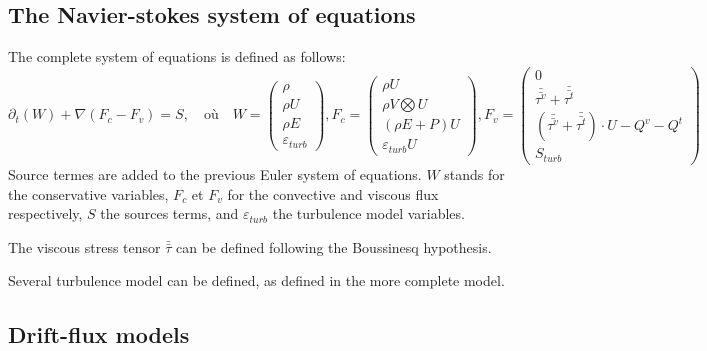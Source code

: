 \subsection{The Navier-stokes system of equations}
The complete system of equations is defined as follows:
\begin{equation}
\partial_t (W) + \nabla (F_c-F_v) = S,
\quad \mbox{où}\quad
W=\begin{pmatrix}
\rho\\
\rho U\\
\rho E\\
\varepsilon_{turb}
\end{pmatrix},
F_c=\begin{pmatrix}
\rho U\\
\rho V\bigotimes U\\
(\rho E +P)U\\
\varepsilon_{turb} U
\end{pmatrix},
F_v=\begin{pmatrix}
0\\
\bar{\bar{\tau^v}} +\bar{\bar{\tau^t}}\\
(\bar{\bar{\tau^v}} +\bar{\bar{\tau^t}})\cdot U-Q^v-Q^t\\
S_{turb}
\end{pmatrix}
\label{sistema4}
\end{equation}
Source termes are added to the previous Euler system of equations. $W$
stands for the conservative variables, $F_c$ et $F_v$ for the
convective and viscous flux respectively, $S$ the sources terms, and
$\varepsilon_{turb}$ the turbulence model variables.

The viscous stress tensor $\bar{\bar{\tau}}$ can be defined following
the Boussinesq hypothesis.

Several turbulence model can be defined, as defined in the more
complete model.

\subsection{Drift-flux models}

